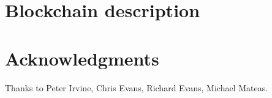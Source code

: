 \documentclass{article}
\begin{document}
\section{Blockchain description}

\cite{Nakamoto2008}

\section*{Acknowledgments}
Thanks to Peter Irvine, Chris Evans, Richard Evans, Michael Mateas.



\end{document}
